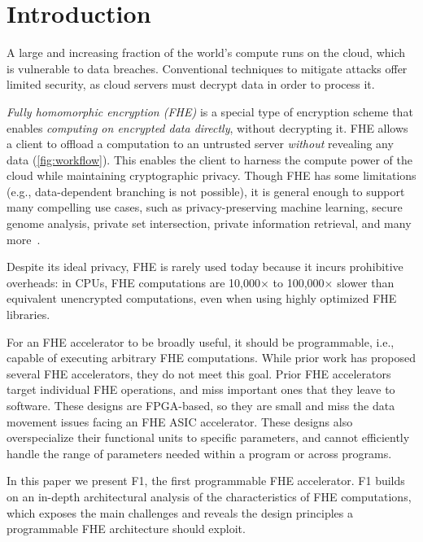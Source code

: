 \chapter{Introduction}\label{sec:intro}

A large and increasing fraction of the world's compute runs on the cloud, which
is vulnerable to data breaches. Conventional techniques to mitigate attacks
offer limited security, as cloud servers must decrypt data in order to process
it.

\figWorkflow

\emph{Fully homomorphic encryption (FHE)} is a special type of encryption
scheme that enables \emph{computing on encrypted data directly}, without
decrypting it. FHE allows a client to offload a computation to an untrusted
server \emph{without} revealing any data (\autoref{fig:workflow}). This enables
the client to harness the compute power of the cloud while maintaining
cryptographic privacy. Though FHE has some limitations (e.g., data-dependent
branching is not possible), it is general enough to support many compelling use
cases, such as privacy-preserving machine learning, secure genome analysis,
private set intersection, private information retrieval, and many
more~\cite{kim2020semi,gilad:icml16:cryptonets,han:aaai19:logistic,han:iacr18:efficient,juvekar2018gazelle,DBLP:conf/ccs/ChenLR17,DBLP:conf/tcc/GentryH19}.

Despite its ideal privacy, FHE is rarely used today because it incurs
prohibitive overheads: in CPUs, FHE computations are 10,000$\times$ to
100,000$\times$ slower than equivalent unencrypted computations, even when
using highly optimized FHE libraries.

For an FHE accelerator to be broadly useful, it should be programmable, i.e.,
capable of executing arbitrary FHE computations. While prior work has proposed
several FHE accelerators, they do not meet this goal. Prior FHE
accelerators~\cite{cousins:hpec14:fpga-he,cousins:tetc17:fpga-he,doroz:tc15:accelerating-fhe,roy:hpca19:fpga-he,riazi:asplos20:heax,turan:tc20:heaws}
target individual FHE operations, and miss important ones that they leave to
software. These designs are FPGA-based, so they are small and miss the data
movement issues facing an FHE ASIC accelerator. These designs also
overspecialize their functional units to specific parameters, and cannot
efficiently handle the range of parameters needed within a program or across
programs.

In this paper we present F1, the first programmable FHE accelerator. F1 builds
on an in-depth architectural analysis of the characteristics of FHE
computations, which exposes the main challenges and reveals the design
principles a programmable FHE architecture should exploit.

